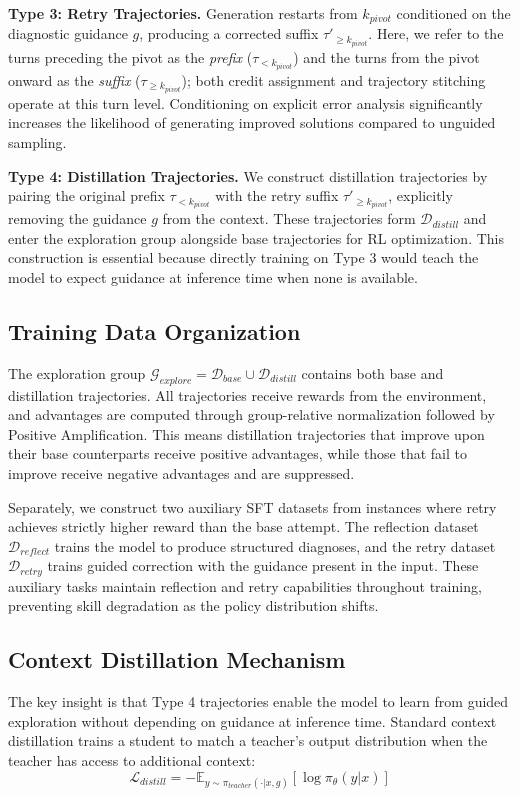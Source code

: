 \documentclass[11pt]{article}
\theoremstyle{definition}
\theoremstyle{remark}
\begin{document}
\textbf{Type 3: Retry Trajectories.} Generation restarts from $k_{pivot}$ conditioned on the diagnostic guidance $g$, producing a corrected suffix $\tau'_{\geq k_{pivot}}$. Here, we refer to the turns preceding the pivot as the \emph{prefix} ($\tau_{<k_{pivot}}$) and the turns from the pivot onward as the \emph{suffix} ($\tau_{\geq k_{pivot}}$); both credit assignment and trajectory stitching operate at this turn level. Conditioning on explicit error analysis significantly increases the likelihood of generating improved solutions compared to unguided sampling.

\textbf{Type 4: Distillation Trajectories.} We construct distillation trajectories by pairing the original prefix $\tau_{<k_{pivot}}$ with the retry suffix $\tau'_{\geq k_{pivot}}$, explicitly removing the guidance $g$ from the context. These trajectories form $\mathcal{D}_{distill}$ and enter the exploration group alongside base trajectories for RL optimization. This construction is essential because directly training on Type 3 would teach the model to expect guidance at inference time when none is available.

\subsection{Training Data Organization}

The exploration group $\mathcal{G}_{explore} = \mathcal{D}_{base} \cup \mathcal{D}_{distill}$ contains both base and distillation trajectories. All trajectories receive rewards from the environment, and advantages are computed through group-relative normalization followed by Positive Amplification. This means distillation trajectories that improve upon their base counterparts receive positive advantages, while those that fail to improve receive negative advantages and are suppressed.

Separately, we construct two auxiliary SFT datasets from instances where retry achieves strictly higher reward than the base attempt. The reflection dataset $\mathcal{D}_{reflect}$ trains the model to produce structured diagnoses, and the retry dataset $\mathcal{D}_{retry}$ trains guided correction with the guidance present in the input. These auxiliary tasks maintain reflection and retry capabilities throughout training, preventing skill degradation as the policy distribution shifts.

\subsection{Context Distillation Mechanism}
The key insight is that Type 4 trajectories enable the model to learn from guided exploration without depending on guidance at inference time. Standard context distillation trains a student to match a teacher's output distribution when the teacher has access to additional context:
\begin{equation}
\mathcal{L}_{distill} = -\mathbb{E}_{y \sim \pi_{teacher}(\cdot | x, g)} \left[ \log \pi_{\theta}(y | x) \right]
\end{equation}
\end{document}
